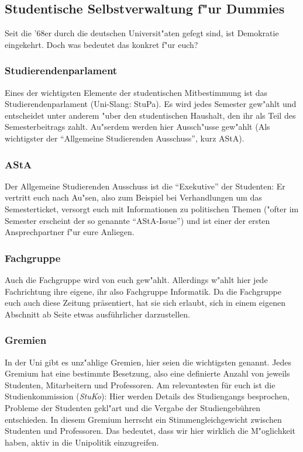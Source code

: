 \subsection*{Studentische Selbstverwaltung f"ur Dummies}
%
%
\begin{multicols}{2}
Seit die '68er durch die deutschen Universit"aten gefegt sind, 
ist Demokratie eingekehrt.
Doch was bedeutet das konkret f"ur euch?

\subsubsection*{Studierendenparlament}
Eines der wichtigsten Elemente der studentischen Mitbestimmung 
ist das Studierendenparlament (Uni-Slang: StuPa).
Es wird jedes Semester gew"ahlt und entscheidet unter anderem 
"uber den studentischen Haushalt, den ihr als Teil des Semesterbeitrags 
zahlt. Au"serdem werden hier Aussch"usse gew"ahlt (Als wichtigster 
der "`Allgemeine Studierenden Ausschuss"', kurz AStA).

\subsubsection*{AStA}
Der Allgemeine Studierenden Ausschuss ist die "`Exekutive"' der 
Studenten: Er vertritt euch nach Au"sen, also zum Beispiel bei 
Verhandlungen um das Semesterticket, versorgt euch mit Informationen 
zu politischen Themen ("ofter im Semester erscheint der so genannte 
"`AStA-Issue"') und ist einer der ersten Ansprechpartner f"ur eure 
Anliegen.

\subsubsection*{Fachgruppe}
Auch die Fachgruppe wird von euch gew"ahlt.
Allerdings w"ahlt hier jede Fachrichtung ihre eigene, ihr also 
Fachgruppe Informatik. Da die Fachgruppe euch auch diese Zeitung
präsentiert, hat sie sich erlaubt, sich in einem eigenen Abschnitt
ab Seite \pageref{fachgruppe} etwas ausführlicher darzustellen.

\subsubsection*{Gremien}
In der Uni gibt es unz"ahlige Gremien, hier seien die wichtigsten
genannt. Jedes Gremium hat eine bestimmte Besetzung, also eine 
definierte Anzahl von jeweils Studenten, Mitarbeitern und Professoren.
Am relevantesten für euch ist die Studienkommission (\emph{StuKo}):
Hier werden Details des Studiengangs besprochen, Probleme der 
Studenten gekl"art und die Vergabe der Studiengebühren entschieden.
In diesem Gremium herrscht ein Stimmengleichgewicht zwischen 
Studenten und Professoren. Das bedeutet, dass wir hier wirklich 
die M"oglichkeit haben, aktiv in die Unipolitik einzugreifen.


\end{multicols}
